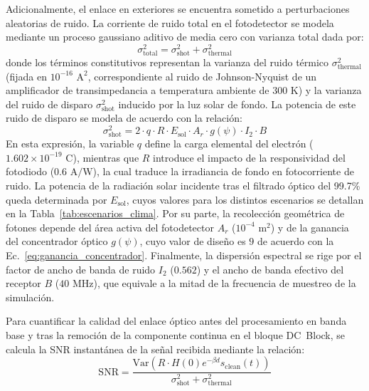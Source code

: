 Adicionalmente, el enlace en exteriores se encuentra sometido a perturbaciones aleatorias de ruido. La corriente de ruido total en el fotodetector se modela mediante un proceso gaussiano aditivo de media cero con varianza total dada por:
\begin{equation}
\sigma^2_{\text{total}} = \sigma^2_{\text{shot}} + \sigma^2_{\text{thermal}}
\label{eq:noise_total}
\end{equation}
donde los términos constitutivos representan la varianza del ruido térmico $\sigma^2_{\text{thermal}}$ (fijada en $10^{-16}\text{~A}^2$, correspondiente al ruido de Johnson-Nyquist de un amplificador de transimpedancia a temperatura ambiente de $300\text{~K}$) y la varianza del ruido de disparo $\sigma^2_{\text{shot}}$ inducido por la luz solar de fondo. La potencia de este ruido de disparo se modela de acuerdo con la relación:
\begin{equation}
\sigma^2_{\text{shot}} = 2 \cdot q \cdot R \cdot E_{\text{sol}} \cdot A_r \cdot g(\psi) \cdot I_2 \cdot B
\label{eq:shot_noise_theory}
\end{equation}
En esta expresión, la variable $q$ define la carga elemental del electrón ($1.602 \times 10^{-19}\text{~C}$), mientras que $R$ introduce el impacto de la responsividad del fotodiodo ($0.6\text{~A/W}$), la cual traduce la irradiancia de fondo en fotocorriente de ruido. La potencia de la radiación solar incidente tras el filtrado óptico del 99.7\% queda determinada por $E_{\text{sol}}$, cuyos valores para los distintos escenarios se detallan en la Tabla~\ref{tab:escenarios_clima}. Por su parte, la recolección geométrica de fotones depende del área activa del fotodetector $A_r$ ($10^{-4}\text{~m}^2$) y de la ganancia del concentrador óptico $g(\psi)$, cuyo valor de diseño es $9$ de acuerdo con la Ec.~\ref{eq:ganancia_concentrador}. Finalmente, la dispersión espectral se rige por el factor de ancho de banda de ruido $I_2$ ($0.562$) y el ancho de banda efectivo del receptor $B$ ($40\text{~MHz}$), que equivale a la mitad de la frecuencia de muestreo de la simulación.

Para cuantificar la calidad del enlace óptico antes del procesamiento en banda base y tras la remoción de la componente continua en el bloque DC~Block, se calcula la SNR instantánea de la señal recibida mediante la relación:
\begin{equation}
\text{SNR} = \frac{\text{Var}\left( R \cdot H(0) e^{-\beta d} s_{\text{clean}}(t) \right)}{\sigma^2_{\text{shot}} + \sigma^2_{\text{thermal}}}
\label{eq:snr_theory}
\end{equation}


